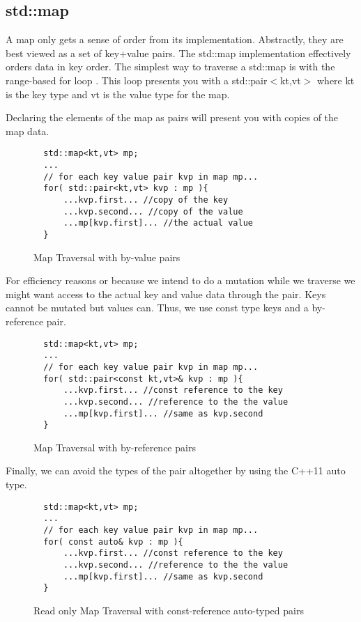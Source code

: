 \documentclass[nobib]{tufte-handout}
\begin{document}
\subsection{std::map}

A map only gets a sense of order from its implementation.   Abstractly, they are best viewed as a set of key+value pairs. The std::map implementation effectively orders data in key order.  The simplest way to traverse a std::map is with the range-based for loop . This loop presents you with a std::pair$<$kt,vt$>$  where kt is the key type and vt is the value type for the map.

Declaring the elements of the map as pairs will present you with copies of the map data.
\begin{figure}[!htbp]
\begin{lstlisting}
  std::map<kt,vt> mp;
  ...
  // for each key value pair kvp in map mp...
  for( std::pair<kt,vt> kvp : mp ){
      ...kvp.first... //copy of the key
      ...kvp.second... //copy of the value
      ...mp[kvp.first]... //the actual value
  }
\end{lstlisting}
\caption{Map Traversal with by-value pairs}
\end{figure}

For efficiency reasons or because we intend to do a mutation while we traverse we might want access to the actual key and value data through the pair. Keys cannot be mutated but values can. Thus, we use const type keys and a by-reference pair.

\begin{figure}[!htbp]
\begin{lstlisting}
  std::map<kt,vt> mp;
  ...
  // for each key value pair kvp in map mp...
  for( std::pair<const kt,vt>& kvp : mp ){
      ...kvp.first... //const reference to the key
      ...kvp.second... //reference to the the value
      ...mp[kvp.first]... //same as kvp.second
  }
\end{lstlisting}
\caption{Map Traversal with by-reference pairs}
\end{figure}

Finally, we can avoid the types of the pair altogether by using the C++11 auto type.
\begin{figure}[!htbp]
\begin{lstlisting}
  std::map<kt,vt> mp;
  ...
  // for each key value pair kvp in map mp...
  for( const auto& kvp : mp ){
      ...kvp.first... //const reference to the key
      ...kvp.second... //reference to the the value
      ...mp[kvp.first]... //same as kvp.second
  }
\end{lstlisting}
\caption{Read only Map Traversal with const-reference auto-typed pairs}
\end{figure}
\end{document}
